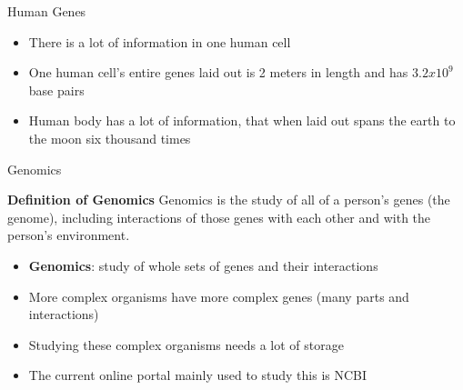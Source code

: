 \documentclass{beamer}
\begin{document}
\begin{frame}{Human Genes}
  \begin{itemize}   
    \item There is a lot of information in one human cell
    \item One human cell's entire genes laid out is 2 meters in length \cite{ency_sci_tech} and has $3.2x10^9$ base pairs \cite{introgenomics}
    \item Human body has a lot of information, that when laid out spans the earth to the moon six thousand times
\end{itemize}
\end{frame}


\begin{frame}{Genomics}
  \begin{block} {\textbf{Definition of Genomics}}
    Genomics is the study of all of a person's genes (the genome), including interactions of those genes with each other and with the person's environment. \cite{genomics-definition}
  \end{block}
  \begin{itemize}   
    \item \textbf{Genomics}: study of whole sets of genes and their interactions \cite{campbell}
    \item More complex organisms have more complex genes (many parts and interactions)
    \item Studying these complex organisms needs a lot of storage
    \item The current online portal mainly used to study this is NCBI \cite{campbell}
  \end{itemize}
\end{frame}
\end{document}
